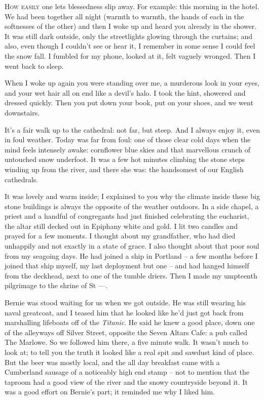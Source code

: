 \textsc{How easily} one lets blessedness slip away. For example: this morning in the hotel. We had been together all night (warmth to warmth, the hands of each in the softnesses of the other) and then I woke up and heard you already in the shower. It was still dark outside, only the streetlights glowing through the curtains; and also, even though I couldn't see or hear it, I remember in some sense I could feel the snow fall. I fumbled for my phone, looked at it, felt vaguely wronged. Then I went back to sleep.

When I woke up again you were standing over me, a murderous look in your eyes, and your wet hair all on end like a devil's halo. I took the hint, showered and dressed quickly. Then you put down your book, put on your shoes, and we went downstairs.

It's a fair walk up to the cathedral: not far, but steep. And I always enjoy it, even in foul weather. Today was far from foul: one of those clear cold days when the mind feels intensely awake: cornflower blue skies and that marvellous crunch of untouched snow underfoot. It was a few hot minutes climbing the stone steps winding up from the river, and there she was: the handsomest of our English cathedrals.

It was lovely and warm inside; I explained to you why the climate inside these big stone buildings is always the opposite of the weather outdoors. In a side chapel, a priest and a handful of congregants had just finished celebrating the eucharist, the altar still decked out in Epiphany white and gold. I lit two candles and prayed for a few moments. I thought about my grandfather, who had died unhappily and not exactly in a state of grace. I also thought about that poor soul from my seagoing days. He had joined a ship in Portland -- a few months before I joined that ship myself, my last deployment but one -- and had hanged himself from the deckhead, next to one of the tumble driers. Then I made my umpteenth pilgrimage to the shrine of St ---.

Bernie was stood waiting for us when we got outside. He was still wearing his naval greatcoat, and I teased him that he looked like he'd just got back from marshalling lifeboats off of the \textit{Titanic}. He said he knew a good place, down one of the alleyways off Silver Street, opposite the Seven Altars Cafe: a pub called The Marlowe. So we followed him there, a five minute walk. It wasn't much to look at; to tell you the truth it looked like a real spit and sawdust kind of place. But the beer was mostly local, and the all day breakfast came with a Cumberland sausage of a noticeably high end stamp -- not to mention that the taproom had a good view of the river and the snowy countryside beyond it. It was a good effort on Bernie's part; it reminded me why I liked him.

